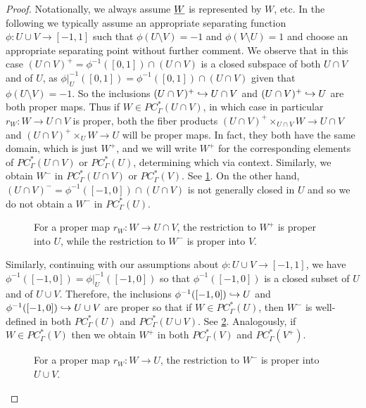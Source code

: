 \begin{proof}
	Notationally, we always assume $\underline{W}$ is represented by $W$, etc.
	In the following we typically assume an appropriate separating function $\phi \colon U \cup V \to [-1,1]$ such that $\phi(U\setminus V) = -1$ and $\phi(V\setminus U) = 1$ and choose an appropriate separating point without further comment.
	We observe that in this case $(U \cap V)^+ = \phi^{-1}([0,1])\cap(U \cap V)$ is a closed subspace of both $U \cap V$ and of $U$, as $\phi|_U^{-1}([0,1]) = \phi^{-1}([0,1]) \cap (U \cap V)$ given that $\phi(U\setminus V) = -1$.
	So the inclusions $(U \cap V)^+ \hookrightarrow U \cap V$ and $(U \cap V)^+ \hookrightarrow U$ are both proper maps.
	Thus if $W \in PC^*_\Gamma(U \cap V)$, in which case in particular $r_W \colon W \to U \cap V$ is proper, both the fiber products $(U \cap V)^+\times_{U \cap V} W \to U \cap V$ and $(U \cap V)^+\times_{U} W \to U$ will be proper maps.
	In fact, they both have the same domain, which is just $W^+$, and we will write $W^+$ for the corresponding elements of $PC^*_\Gamma(U \cap V)$ or $PC^*_\Gamma(U)$, determining which via context.
	Similarly, we obtain $W^-$ in $PC^*_\Gamma(U \cap V)$ or $PC^*_\Gamma(V)$.
	See \cref{F: MV1}.
	On the other hand, $(U \cap V)^- = \phi^{-1}([-1,0])\cap(U \cap V)$ is not generally closed in $U$ and so we do not obtain a $W^-$ in $PC^*_\Gamma(U)$.

	\begin{figure}[h]
		
		\caption{For a proper map $r_W \colon W \to U \cap V$, the restriction to $W^+$ is proper into $U$, while the restriction to $W^-$ is proper into $V$.}
		\label{F: MV1}
	\end{figure}

	Similarly, continuing with our assumptions about $\phi \colon U \cup V \to [-1,1]$, we have $\phi^{-1}([-1,0]) = \phi|_U^{-1}([-1,0])$ so that $\phi^{-1}([-1,0])$ is a closed subset of $U$ and of $U \cup V$.
	Therefore, the inclusions $\phi^{-1}([-1,0]) \hookrightarrow U$ and $\phi^{-1}([-1,0]) \hookrightarrow U \cup V$ are proper so that if $W \in PC^*_\Gamma(U)$, then $W^-$ is well-defined in both $PC^*_\Gamma(U)$ and $PC^*_\Gamma(U \cup V)$.
	See \cref{F: MV2}.
	Analogously, if $W \in PC^*_\Gamma(V)$ then we obtain $W^+$ in both $PC^*_\Gamma(V)$ and $PC^*_\Gamma(V^+)$.

	\begin{figure}[h]
		
		\caption{For a proper map $r_W \colon W \to U$, the restriction to $W^-$ is proper into $U \cup V$.}
		\label{F: MV2}
	\end{figure}


\end{proof}
